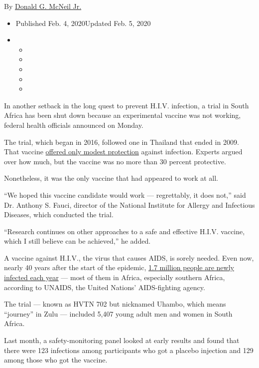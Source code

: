 By
\href{https://www.nytimes3xbfgragh.onion/by/donald-g-mcneil-jr}{Donald
G. McNeil Jr.}

\begin{itemize}
\item
  Published Feb. 4, 2020Updated Feb. 5, 2020
\item
  \begin{itemize}
  \item
  \item
  \item
  \item
  \item
  \end{itemize}
\end{itemize}

In another setback in the long quest to prevent H.I.V. infection, a
trial in South Africa has been shut down because an experimental vaccine
was not working, federal health officials announced on Monday.

The trial, which began in 2016, followed one in Thailand that ended in
2009. That vaccine
\href{https://www.nytimes3xbfgragh.onion/2009/10/21/health/research/21vaccine.html}{offered
only modest protection} against infection. Experts argued over how much,
but the vaccine was no more than 30 percent protective.

Nonetheless, it was the only vaccine that had appeared to work at all.

``We hoped this vaccine candidate would work --- regrettably, it does
not,'' said Dr. Anthony S. Fauci, director of the National Institute for
Allergy and Infectious Diseases, which conducted the trial.

``Research continues on other approaches to a safe and effective H.I.V.
vaccine, which I still believe can be achieved,'' he added.

A vaccine against H.I.V., the virus that causes AIDS, is sorely needed.
Even now, nearly 40 years after the start of the epidemic,
\href{https://www.unaids.org/en/resources/documents/2019/2019-UNAIDS-data}{1.7
million people are newly infected each year} --- most of them in Africa,
especially southern Africa, according to UNAIDS, the United Nations'
AIDS-fighting agency.

The trial --- known as HVTN 702 but nicknamed Uhambo, which means
``journey'' in Zulu --- included 5,407 young adult men and women in
South Africa.

Last month, a safety-monitoring panel looked at early results and found
that there were 123 infections among participants who got a placebo
injection and 129 among those who got the vaccine.

